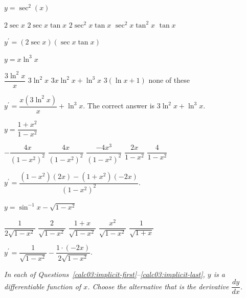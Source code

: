 \question
$y=\sec ^{2}(x)$
\begin{choices}
  \choice $2 \sec x$
  \choice $2 \sec x \tan x$
  \CorrectChoice $2 \sec ^{2} x \tan x$
  \choice $\sec ^{2} x \tan ^{2} x$
  \choice $\tan x$
\end{choices}
\begin{solution}
$y^{\prime}=(2 \sec x)(\sec x \tan x)$
\end{solution}

\question
$y=x \ln ^{3} x$
\begin{choices}
  \choice $\dfrac{3 \ln ^{2} x}{x}$
  \choice $3 \ln ^{2} x$
  \choice $3 x \ln ^{2} x+\ln ^{3} x$
  \choice $3(\ln x+1)$
  \CorrectChoice none of these
\end{choices}
\begin{solution}
$y^{\prime}=\dfrac{x\left(3 \ln ^{2} x\right)}{x}+\ln ^{3} x$. The correct answer is $3 \ln ^{2} x+\ln ^{3} x$.
\end{solution}



\newpage



\question
$y=\dfrac{1+x^{2}}{1-x^{2}}$
\begin{choices}
  \choice $-\dfrac{4 x}{\left(1-x^{2}\right)^{2}}$
  \CorrectChoice $\dfrac{4 x}{\left(1-x^{2}\right)^{2}}$
  \choice $\dfrac{-4 x^{3}}{\left(1-x^{2}\right)^{2}}$
  \choice $\dfrac{2 x}{1-x^{2}}$
  \choice $\dfrac{4}{1-x^{2}}$
\end{choices}
\begin{solution}
$y^{\prime}=\dfrac{\left(1-x^{2}\right)(2 x)-\left(1+x^{2}\right)(-2 x)}{\left(1-x^{2}\right)^{2}}$.
\end{solution}

\question\label{calc03:deriv-last}
$y=\sin ^{-1} x-\sqrt{1-x^{2}}$
\begin{choices}
  \choice $\dfrac{1}{2 \sqrt{1-x^{2}}}$
  \choice $\dfrac{2}{\sqrt{1-x^{2}}}$
  \CorrectChoice $\dfrac{1+x}{\sqrt{1-x^{2}}}$
  \choice $\dfrac{x^{2}}{\sqrt{1-x^{2}}}$
  \choice $\dfrac{1}{\sqrt{1+x}}$
\end{choices}
\begin{solution}
$y^{\prime}=\dfrac{1}{\sqrt{1-x^{2}}}-\dfrac{1 \cdot(-2 x)}{2 \sqrt{1-x^{2}}}$.
\end{solution}




\newpage



\begin{EnvFullwidth}
\textit{In each of Questions~\ref{calc03:implicit-first}--\ref{calc03:implicit-last}, $y$ is a differentiable function of $x$. Choose the alternative that is the derivative $\dfrac{d y}{d x}$.}
\end{EnvFullwidth}

